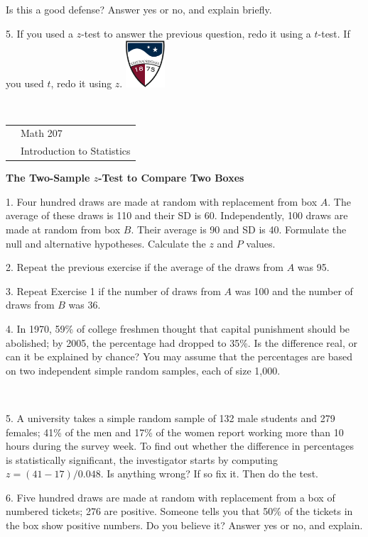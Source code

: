 \documentclass[10pt]{article}
\begin{document}
Is this a good defense?  Answer yes or no, and explain briefly.
\vspace{3in}

5. If you used a $z$-test to answer the previous question, redo it using a $t$-test.
If you used $t$, redo it using $z$.
\vfill
\eject
\href{http://www.su.edu}{\includegraphics[height=1.75cm]{sulogo.eps}}
\vspace{-1.79cm}

{{\ }\hfill\small
\begin{tabular}{cl}
& Math 207\\
& Introduction to Statistics\\
\end{tabular}
}
\medskip

\begin{center}
\textbf{\large  The Two-Sample $z$-Test to Compare Two Boxes}
\end{center}
\smallskip

1. 
Four hundred draws are made at random with replacement from box $A$.  The
average of these draws is 110 and their SD is 60.
Independently, 100 draws are made at random from box $B$.  Their average is 90
and SD is 40.  Formulate the null and alternative hypotheses.  Calculate the $z$
and $P$ values.
\vspace{1.5in}


2. Repeat the previous exercise if the average of the draws from $A$ was
95.
\vspace{1.5in}

3. Repeat Exercise 1 if the number of draws from $A$ was 100 and the number
of draws from $B$ was 36.
\vspace{1.5in}

4. %
In 1970, 59\% of college freshmen thought that capital punishment
should be abolished;  by 2005, the percentage had dropped to 35\%.
Is the difference real, or can it be explained by chance? You may assume that
the percentages are based on two independent simple random samples, each of
size 1,000.

\vfill
\eject
{\ }

5. %
A university takes a simple random sample of 132 male students and 279 females;
41\% of the men and 17\% of the women report working more than 10 hours 
during the survey week.  To find out whether the difference in percentages is 
statistically significant, the investigator starts by computing
$z=(41-17)/0.048$.  Is anything wrong?    If so fix it.  Then do the test.
\vspace{2in}


6. %
Five hundred draws are made at random with replacement from a box
of numbered tickets;  276 are positive.  Someone tells you that
50\% of the tickets in the box show positive numbers.  Do you believe it?  
Answer yes or no, and explain.
\vspace{2in}

\vfill
\eject
\end{document}
